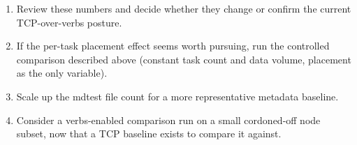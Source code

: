 \documentclass[11pt]{article}
\begin{document}
\begin{enumerate}
\item Review these numbers and decide whether they change or confirm the current TCP-over-verbs posture.
\item If the per-task placement effect seems worth pursuing, run the controlled comparison described above (constant task count and data volume, placement as the only variable).
\item Scale up the mdtest file count for a more representative metadata baseline.
\item Consider a verbs-enabled comparison run on a small cordoned-off node subset, now that a TCP baseline exists to compare it against.
\end{enumerate}
\end{document}
